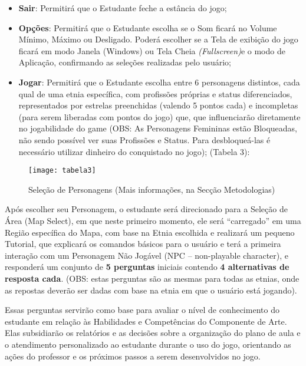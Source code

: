 \begin{itemize}[leftmargin=2em]
\item\textbf{Sair}: Permitirá que o Estudante feche a estância do jogo; 

\item\textbf{Opções}: Permitirá que o Estudante escolha se o Som ficará no Volume Mínimo, Máximo ou Desligado. Poderá escolher se a Tela de exibição do jogo ficará em modo Janela (Windows) ou Tela Cheia \textit{(Fullscreen)}e o modo de Aplicação, confirmando as seleções realizadas pelo usuário; 

\item\textbf{Jogar}: Permitirá que o Estudante escolha entre 6 personagens distintos, cada qual de uma etnia específica, com profissões próprias e status diferenciados, representados por estrelas preenchidas (valendo 5 pontos cada) e incompletas (para serem liberadas com pontos do jogo) que, que influenciarão diretamente no jogabilidade do game (OBS: As Personagens Femininas estão Bloqueadas, não sendo possível ver suas Profissões e Status. Para desbloqueá-las é necessário utilizar dinheiro do conquistado no jogo); (Tabela 3): 
\end{itemize}

\begin{figure}[!h]
    \centering
    \caption{Seleção de Personagens (Mais informações, na Secção Metodologias) }%
    \label{fig:tabela2}
    \texttt{[image: tabela3]}
    \end{figure}

Após escolher seu Personagem, o estudante será direcionado para a Seleção de Área (Map Select), em que neste primeiro momento, ele será “carregado” em uma Região específica do Mapa, com base na Etnia escolhida e realizará um pequeno Tutorial, que explicará os comandos básicos para o usuário e terá a primeira interação com um Personagem Não Jogável (NPC – non-playable character), e responderá um conjunto de \textbf{5 perguntas} iniciais contendo \textbf{4 alternativas de resposta cada}. (OBS: estas perguntas são as mesmas para todas as etnias, onde as repostas deverão ser dadas com base na etnia em que o usuário está jogando). 

Essas perguntas servirão como base para avaliar o nível de conhecimento do estudante em relação às Habilidades e Competências do Componente de Arte. Elas subsidiarão os relatórios e as decisões sobre a organização do plano de aula e o atendimento personalizado ao estudante durante o uso do jogo, orientando as ações do professor e os próximos passos a serem desenvolvidos no jogo. 